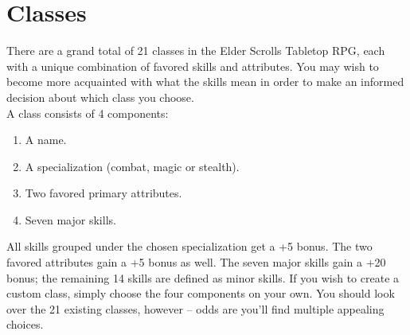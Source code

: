 \section{Classes}
There are a grand total of 21 classes in the Elder Scrolls Tabletop RPG, each with a unique combination of favored skills and attributes. You may wish to become more acquainted with what the skills mean in order to make an informed decision about which class you choose.\\

A class consists of 4 components:
\begin{enumerate}
	\item A name.
	\item A specialization (combat, magic or stealth).
	\item Two favored primary attributes.
	\item Seven major skills.
\end{enumerate}

All skills grouped under the chosen specialization get a +5 bonus. The two favored attributes gain a +5 bonus as well. The seven major skills gain a +20 bonus; the remaining 14 skills are defined as minor skills. If you wish to create a custom class, simply choose the four components on your own. You should look over the 21 existing classes, however -- odds are you'll find multiple appealing choices.\\

